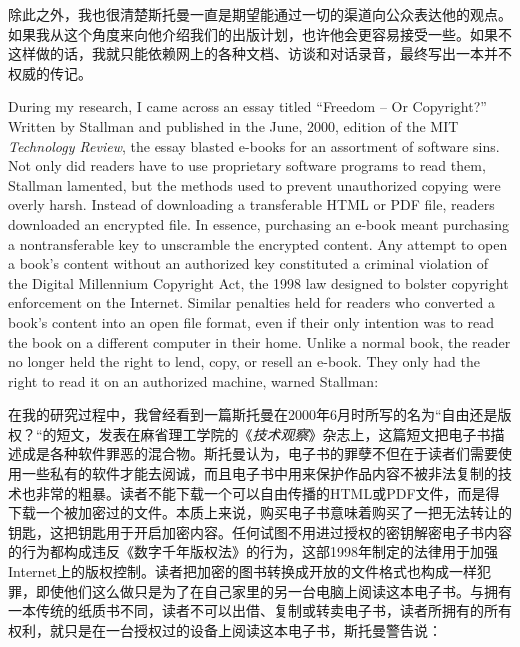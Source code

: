 \ifdefined\chs
除此之外，我也很清楚斯托曼一直是期望能通过一切的渠道向公众表达他的观点。如果我从这个角度来向他介绍我们的出版计划，也许他会更容易接受一些。如果不这样做的话，我就只能依赖网上的各种文档、访谈和对话录音，最终写出一本并不权威的传记。
\fi

\ifdefined\eng
During my research, I came across an essay titled ``Freedom -- Or Copyright?'' Written by Stallman and published in the June, 2000, edition of the MIT \textit{Technology Review}, the essay blasted e-books for an assortment of software sins. Not only did readers have to use proprietary software programs to read them, Stallman lamented, but the methods used to prevent unauthorized copying were overly harsh. Instead of downloading a transferable HTML or PDF file, readers downloaded an encrypted file. In essence, purchasing an e-book meant purchasing a nontransferable key to unscramble the encrypted content. Any attempt to open a book's content without an authorized key constituted a criminal violation of the Digital Millennium Copyright Act, the 1998 law designed to bolster copyright enforcement on the Internet. Similar penalties held for readers who converted a book's content into an open file format, even if their only intention was to read the book on a different computer in their home. Unlike a normal book, the reader no longer held the right to lend, copy, or resell an e-book. They only had the right to read it on an authorized machine, warned Stallman:
\fi

\ifdefined\chs
在我的研究过程中，我曾经看到一篇斯托曼在2000年6月时所写的名为“自由还是版权？“的短文，发表在麻省理工学院的《\textit{技术观察}》杂志上，这篇短文把电子书描述成是各种软件罪恶的混合物。斯托曼认为，电子书的罪孽不但在于读者们需要使用一些私有的软件才能去阅诚，而且电子书中用来保护作品内容不被非法复制的技术也非常的粗暴。读者不能下载一个可以自由传播的HTML或PDF文件，而是得下载一个被加密过的文件。本质上来说，购买电子书意味着购买了一把无法转让的钥匙，这把钥匙用于开启加密内容。任何试图不用进过授权的密钥解密电子书内容的行为都构成违反《数字千年版权法》的行为，这部1998年制定的法律用于加强Internet上的版权控制。读者把加密的图书转换成开放的文件格式也构成一样犯罪，即使他们这么做只是为了在自己家里的另一台电脑上阅读这本电子书。与拥有一本传统的纸质书不同，读者不可以出借、复制或转卖电子书，读者所拥有的所有权利，就只是在一台授权过的设备上阅读这本电子书，斯托曼警告说：
\fi

